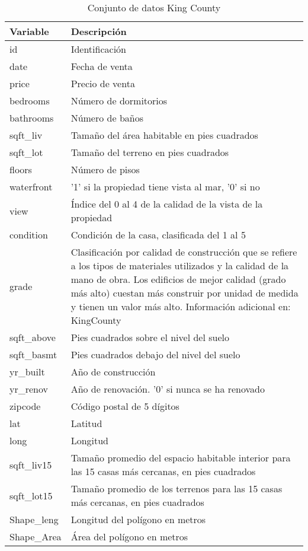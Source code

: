 \begin{table}[H]
	\centering
	\caption{Conjunto de datos King County}
	\label{data-county}
    \begin{tabular}{|l|m{30em}|}
        \hline
        \rowcolor[gray]{0.8}
        Variable & Descripción \\
        \hline
        id & Identificación \\
        \hline
        date & Fecha de venta \\
        \hline
        price & Precio de venta \\
        \hline
        bedrooms & Número de dormitorios \\
        \hline
        bathrooms & Número de baños \\
        \hline
        sqft\_liv & Tamaño del área habitable en pies cuadrados \\
        \hline
        sqft\_lot & Tamaño del terreno en pies cuadrados \\
        \hline
        floors & Número de pisos \\
        \hline
        waterfront & '1' si la propiedad tiene vista al mar, '0' si no \\
        \hline
        view & Índice del 0 al 4 de la calidad de la vista de la propiedad \\
        \hline
        condition & Condición de la casa, clasificada del 1 al 5 \\
        \hline
        grade & Clasificación por calidad de construcción que se refiere a los tipos de materiales utilizados y la calidad de la mano de obra. Los edificios de mejor calidad (grado más alto) cuestan más construir por unidad de medida y tienen un valor más alto. Información adicional en: KingCounty \\
        \hline
        sqft\_above & Pies cuadrados sobre el nivel del suelo \\
        \hline
        sqft\_basmt & Pies cuadrados debajo del nivel del suelo \\
        \hline
        yr\_built & Año de construcción \\
        \hline
        yr\_renov & Año de renovación. '0' si nunca se ha renovado \\
        \hline
        zipcode & Código postal de 5 dígitos \\
        \hline
        lat & Latitud \\
        \hline
        long & Longitud \\
        \hline
        sqft\_liv15 & Tamaño promedio del espacio habitable interior para las 15 casas más cercanas, en pies cuadrados \\
        \hline
        sqft\_lot15 & Tamaño promedio de los terrenos para las 15 casas más cercanas, en pies cuadrados \\
        \hline
        Shape\_leng & Longitud del polígono en metros \\
        \hline
        Shape\_Area & Área del polígono en metros \\
        \hline
    \end{tabular}
\end{table}  


